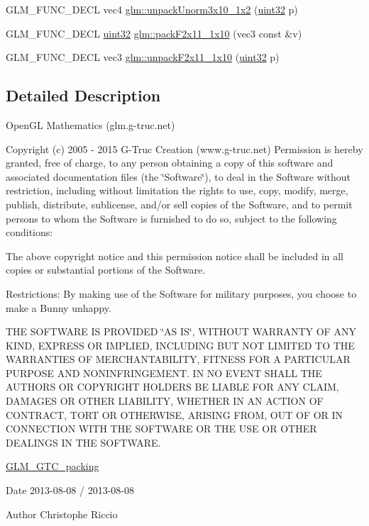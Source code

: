 \begin{DoxyCompactItemize}
G\+L\+M\+\_\+\+F\+U\+N\+C\+\_\+\+D\+E\+C\+L vec4 \hyperlink{group__gtc__packing_gaf69ace2b5e9234f8afb4e99c3df1193d}{glm\+::unpack\+Unorm3x10\+\_\+1x2} (\hyperlink{stb__image_8c_a1134b580f8da4de94ca6b1de4d37975e}{uint32} p)
\item 
G\+L\+M\+\_\+\+F\+U\+N\+C\+\_\+\+D\+E\+C\+L \hyperlink{stb__image_8c_a1134b580f8da4de94ca6b1de4d37975e}{uint32} \hyperlink{group__gtc__packing_ga8c2a0eeee677ca4dafd9e093d9e81062}{glm\+::pack\+F2x11\+\_\+1x10} (vec3 const \&v)
\item 
G\+L\+M\+\_\+\+F\+U\+N\+C\+\_\+\+D\+E\+C\+L vec3 \hyperlink{group__gtc__packing_ga8b9c7991eb021d95c778bf5c0b2f7824}{glm\+::unpack\+F2x11\+\_\+1x10} (\hyperlink{stb__image_8c_a1134b580f8da4de94ca6b1de4d37975e}{uint32} p)
\end{DoxyCompactItemize}


\subsection{Detailed Description}
Open\+G\+L Mathematics (glm.\+g-\/truc.\+net)

Copyright (c) 2005 -\/ 2015 G-\/\+Truc Creation (www.\+g-\/truc.\+net) Permission is hereby granted, free of charge, to any person obtaining a copy of this software and associated documentation files (the \char`\"{}\+Software\char`\"{}), to deal in the Software without restriction, including without limitation the rights to use, copy, modify, merge, publish, distribute, sublicense, and/or sell copies of the Software, and to permit persons to whom the Software is furnished to do so, subject to the following conditions\+:

The above copyright notice and this permission notice shall be included in all copies or substantial portions of the Software.

Restrictions\+: By making use of the Software for military purposes, you choose to make a Bunny unhappy.

T\+H\+E S\+O\+F\+T\+W\+A\+R\+E I\+S P\+R\+O\+V\+I\+D\+E\+D \char`\"{}\+A\+S I\+S\char`\"{}, W\+I\+T\+H\+O\+U\+T W\+A\+R\+R\+A\+N\+T\+Y O\+F A\+N\+Y K\+I\+N\+D, E\+X\+P\+R\+E\+S\+S O\+R I\+M\+P\+L\+I\+E\+D, I\+N\+C\+L\+U\+D\+I\+N\+G B\+U\+T N\+O\+T L\+I\+M\+I\+T\+E\+D T\+O T\+H\+E W\+A\+R\+R\+A\+N\+T\+I\+E\+S O\+F M\+E\+R\+C\+H\+A\+N\+T\+A\+B\+I\+L\+I\+T\+Y, F\+I\+T\+N\+E\+S\+S F\+O\+R A P\+A\+R\+T\+I\+C\+U\+L\+A\+R P\+U\+R\+P\+O\+S\+E A\+N\+D N\+O\+N\+I\+N\+F\+R\+I\+N\+G\+E\+M\+E\+N\+T. I\+N N\+O E\+V\+E\+N\+T S\+H\+A\+L\+L T\+H\+E A\+U\+T\+H\+O\+R\+S O\+R C\+O\+P\+Y\+R\+I\+G\+H\+T H\+O\+L\+D\+E\+R\+S B\+E L\+I\+A\+B\+L\+E F\+O\+R A\+N\+Y C\+L\+A\+I\+M, D\+A\+M\+A\+G\+E\+S O\+R O\+T\+H\+E\+R L\+I\+A\+B\+I\+L\+I\+T\+Y, W\+H\+E\+T\+H\+E\+R I\+N A\+N A\+C\+T\+I\+O\+N O\+F C\+O\+N\+T\+R\+A\+C\+T, T\+O\+R\+T O\+R O\+T\+H\+E\+R\+W\+I\+S\+E, A\+R\+I\+S\+I\+N\+G F\+R\+O\+M, O\+U\+T O\+F O\+R I\+N C\+O\+N\+N\+E\+C\+T\+I\+O\+N W\+I\+T\+H T\+H\+E S\+O\+F\+T\+W\+A\+R\+E O\+R T\+H\+E U\+S\+E O\+R O\+T\+H\+E\+R D\+E\+A\+L\+I\+N\+G\+S I\+N T\+H\+E S\+O\+F\+T\+W\+A\+R\+E.

\hyperlink{group__gtc__packing}{G\+L\+M\+\_\+\+G\+T\+C\+\_\+packing}

\begin{DoxyDate}{Date}
2013-\/08-\/08 / 2013-\/08-\/08 
\end{DoxyDate}
\begin{DoxyAuthor}{Author}
Christophe Riccio 
\end{DoxyAuthor}

